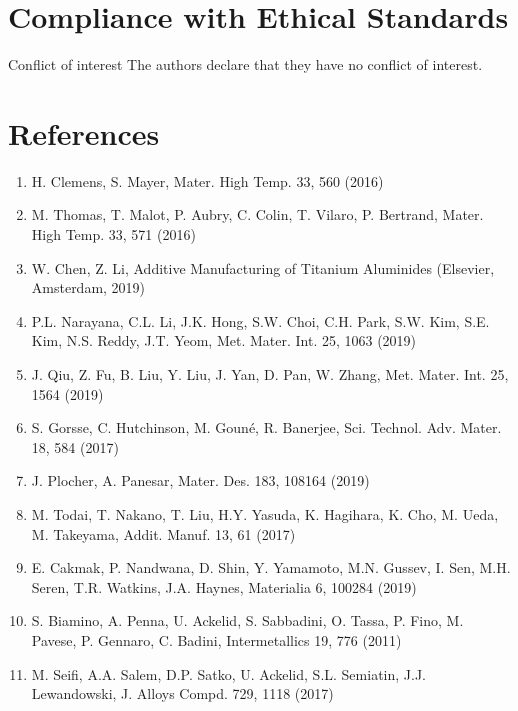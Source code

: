 \documentclass[10pt]{article}
\begin{document}
\section*{Compliance with Ethical Standards}
Conflict of interest The authors declare that they have no conflict of interest.

\section*{References}
\begin{enumerate}
  \item H. Clemens, S. Mayer, Mater. High Temp. 33, 560 (2016)

  \item M. Thomas, T. Malot, P. Aubry, C. Colin, T. Vilaro, P. Bertrand, Mater. High Temp. 33, 571 (2016)

  \item W. Chen, Z. Li, Additive Manufacturing of Titanium Aluminides (Elsevier, Amsterdam, 2019)

  \item P.L. Narayana, C.L. Li, J.K. Hong, S.W. Choi, C.H. Park, S.W. Kim, S.E. Kim, N.S. Reddy, J.T. Yeom, Met. Mater. Int. 25, 1063 (2019)

  \item J. Qiu, Z. Fu, B. Liu, Y. Liu, J. Yan, D. Pan, W. Zhang, Met. Mater. Int. 25, 1564 (2019)

  \item S. Gorsse, C. Hutchinson, M. Gouné, R. Banerjee, Sci. Technol. Adv. Mater. 18, 584 (2017)

  \item J. Plocher, A. Panesar, Mater. Des. 183, 108164 (2019)

  \item M. Todai, T. Nakano, T. Liu, H.Y. Yasuda, K. Hagihara, K. Cho, M. Ueda, M. Takeyama, Addit. Manuf. 13, 61 (2017)

  \item E. Cakmak, P. Nandwana, D. Shin, Y. Yamamoto, M.N. Gussev, I. Sen, M.H. Seren, T.R. Watkins, J.A. Haynes, Materialia 6, 100284 (2019)

  \item S. Biamino, A. Penna, U. Ackelid, S. Sabbadini, O. Tassa, P. Fino, M. Pavese, P. Gennaro, C. Badini, Intermetallics 19, 776 (2011)

  \item M. Seifi, A.A. Salem, D.P. Satko, U. Ackelid, S.L. Semiatin, J.J. Lewandowski, J. Alloys Compd. 729, 1118 (2017)


\end{enumerate}
\end{document}
